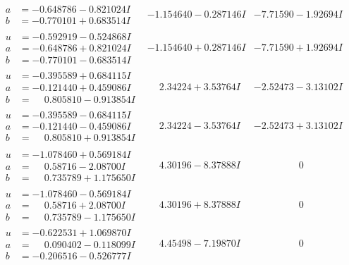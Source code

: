 \documentclass[1p]{elsarticle_modified}
\theoremstyle{definition}
\begin{document}
$$\begin{array}{c|c|c}
\begin{aligned}
a &= -0.648786 - 0.821024 I \\
b &= -0.770101 + 0.683514 I\end{aligned}
 & -1.154640 - 0.287146 I & -7.71590 - 1.92694 I \\ \hline\begin{aligned}
u &= -0.592919 - 0.524868 I \\
a &= -0.648786 + 0.821024 I \\
b &= -0.770101 - 0.683514 I\end{aligned}
 & -1.154640 + 0.287146 I & -7.71590 + 1.92694 I \\ \hline\begin{aligned}
u &= -0.395589 + 0.684115 I \\
a &= -0.121440 + 0.459086 I \\
b &= \phantom{-}0.805810 - 0.913854 I\end{aligned}
 & \phantom{-}2.34224 + 3.53764 I & -2.52473 - 3.13102 I \\ \hline\begin{aligned}
u &= -0.395589 - 0.684115 I \\
a &= -0.121440 - 0.459086 I \\
b &= \phantom{-}0.805810 + 0.913854 I\end{aligned}
 & \phantom{-}2.34224 - 3.53764 I & -2.52473 + 3.13102 I \\ \hline\begin{aligned}
u &= -1.078460 + 0.569184 I \\
a &= \phantom{-}0.58716 - 2.08700 I \\
b &= \phantom{-}0.735789 + 1.175650 I\end{aligned}
 & \phantom{-}4.30196 - 8.37888 I & \phantom{-0.000000 } 0 \\ \hline\begin{aligned}
u &= -1.078460 - 0.569184 I \\
a &= \phantom{-}0.58716 + 2.08700 I \\
b &= \phantom{-}0.735789 - 1.175650 I\end{aligned}
 & \phantom{-}4.30196 + 8.37888 I & \phantom{-0.000000 } 0 \\ \hline\begin{aligned}
u &= -0.622531 + 1.069870 I \\
a &= \phantom{-}0.090402 - 0.118099 I \\
b &= -0.206516 - 0.526777 I\end{aligned}
 & \phantom{-}4.45498 - 7.19870 I & \phantom{-0.000000 } 0 \\ \hline\begin{aligned}

\end{aligned}
\end{array}$$
\end{document}
